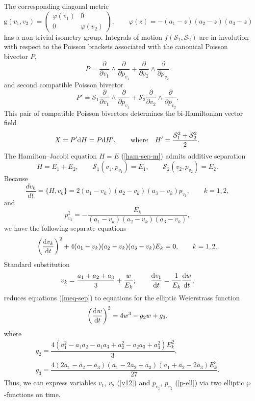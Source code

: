 \documentclass[pdftex]{sigma}
\numberwithin{equation}{section}
\begin{document}
The corresponding diagonal metric
\begin{equation}\label{varphi}
\mathrm g(v_1,v_2)=\left(
 \begin{matrix}
 \varphi( v_1) & 0 \\
 0 & \varphi(v_2)
 \end{matrix}
 \right) ,\qquad \varphi(z)=-(a_1-z)(a_2-z)(a_3-z)
\end{equation}
has a non-trivial isometry group. Integrals of motion $f(\mathcal{S}_1,\mathcal{S}_2)$ are in involution with respect to the Poisson brackets associated with the canonical Poisson bivector $P$,
\begin{equation}\label{p1}
P=\dfrac{\partial}{\partial v_1}\wedge\frac{\partial}{\partial p_{v_1}}+\dfrac{\partial}{\partial v_2}\wedge\frac{\partial}{\partial p_{v_2}}
\end{equation}
 and second compatible Poisson bivector
 \begin{equation}\label{p2}
P'=\mathcal{S}_1 \dfrac{\partial}{\partial v_1}\wedge\frac{\partial}{\partial p_{v_1}}+\mathcal{S}_2 \dfrac{\partial}{\partial v_2}\wedge\frac{\partial}{\partial p_{v_2}} .
\end{equation}
This pair of compatible Poisson bivectors determines the bi-Hamiltonian vector field
\[
X=P'{\rm d}H=P{\rm d}H' ,\qquad\text{where}\quad H'=\frac{\mathcal{S}_1^2+\mathcal{S}_2^2}{2} .
\]
The Hamilton--Jacobi equation $H=E$ (\ref{ham-sep-m}) admits additive separation
\[
H=E_1+E_2 ,\qquad \mathcal{S}_1(v_1,p_{v_1})=E_1, \qquad \mathcal{S}_2(v_2,p_{v_2})=E_2 .
\]
Because
\begin{equation}\label{meq-sep}
\dfrac{d{v}_k}{dt}=\{H,v_k\}=2(a_1 - v_k)(a_2 - v_k)(a_3 - v_k)p_{v_k} ,\qquad k=1,2,
\end{equation}
and
\begin{equation}\label{p-ell}
p_{v_k}^2=-\frac{E_k}{(a_1 - v_k)(a_2 - v_k)(a_3 - v_k)} ,
\end{equation}
we have the following separate equations
\begin{equation}\label{sep-flow}
\left(\dfrac{{\rm d}{v}_k}{{\rm d}t}\right)^2+4(a_1 - v_k)(a_2 - v_k)(a_3 - v_k)E_k=0 ,\qquad k=1,2.
\end{equation}
Standard substitution
\begin{equation}\label{v12}
v_{k}=\dfrac{a_1+a_2+a_3}{3} +\dfrac{w}{E_k} ,\qquad \dfrac{{\rm d}v_1}{{\rm d}t}=\dfrac{1}{E_k}\dfrac{{\rm d}w}{{\rm d}t} ,
\end{equation}
reduces equations (\ref{meq-sep}) to equations for the elliptic Weierstrass function
\[
\left(\frac{{\rm d}w}{{\rm d}t}\right)^2=4w^3-g_2w+g_3 ,
\]
where
\begin{gather*}
g_2=\dfrac{4(a_1^2 - a_1a_2 - a_1a_3 + a_2^2 - a_2a_3 + a_3^2)E_k^2}{3} ,\\
g_3=\dfrac{4(2a_1 - a_2 - a_3)(a_1 -2 a_2+a_3)(a_1 +a_2 -2 a_3)E_k^3}{27} .
\end{gather*}
Thus, we can express variables $v_{1}$, $v_{2}$ (\ref{v12}) and $p_{v_1}$, $p_{v_2}$ (\ref{p-ell}) via two elliptic $\wp$-functions on time.
\end{document}
